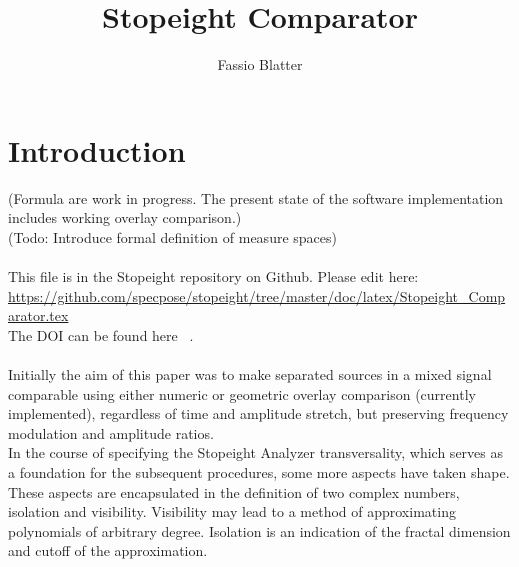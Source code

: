 \documentclass{report}
\begin{document}
\title{Stopeight Comparator}
\author{Fassio Blatter}
\maketitle

\chapter{Introduction}
(Formula are work in progress. The present state of the software implementation includes working overlay comparison.)\\
(Todo: Introduce formal definition of measure spaces)\\\\
This file is in the Stopeight repository on Github. Please edit here:\\
\href{https://github.com/specpose/stopeight/tree/master/doc/latex/Stopeight\_Comparator.tex}{https://github.com/specpose/stopeight/tree/master/doc/latex/Stopeight\_Comparator.tex}\\
The DOI can be found here ~\cite{Stopeight}.\\\\
Initially the aim of this paper was to make separated sources in a mixed signal comparable using either numeric or geometric overlay comparison (currently implemented), regardless of time and amplitude stretch, but preserving frequency modulation and amplitude ratios.\\
In the course of specifying the Stopeight Analyzer transversality, which serves as a foundation for the subsequent procedures, some more aspects have taken shape. These aspects are encapsulated in the definition of two complex numbers, isolation and visibility. Visibility may lead to a method of approximating polynomials of arbitrary degree. Isolation is an indication of the fractal dimension and cutoff of the approximation.
\end{document}
